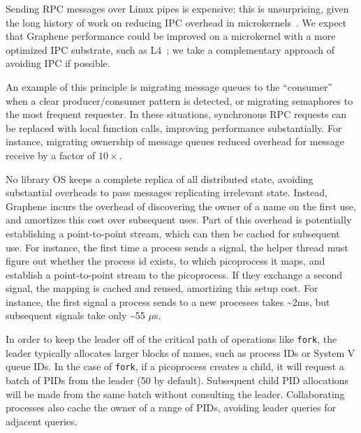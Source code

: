 \vspace{5pt}
Sending RPC messages over Linux pipes is expensive;
this is unsurprising, given the long history of 
work on reducing IPC overhead in microkernels~\citep{liedtke93sosp,chen93memory}.  
We expect that Graphene performance could be improved on a 
microkernel with
a more optimized IPC substrate, such as L4~\citep{liedtke95sosp,klein09sel4,elphinstone13microkernels};
we take a complementary approach of avoiding IPC if possible.

An example of this principle is migrating message queues to the ``consumer'' when a 
clear producer/consumer pattern is detected, or migrating semaphores to the most frequent requester.
In these situations, synchronous RPC requests can be replaced with local function calls, improving
performance substantially.  For instance, migrating ownership of message queues 
reduced overhead for message receive by a factor of $10\times$.

\vspace{5pt}
No library OS keeps a complete replica of all distributed state,
avoiding substantial overheads to pass messages replicating irrelevant state.
Instead, Graphene incurs the overhead of discovering the owner of a name
on the first use, and amortizes this cost over subsequent uses.
Part of this overhead is potentially establishing a point-to-point stream,
which can then be cached for subsequent use.
For instance, the first time a process sends a signal, the helper thread 
must figure out whether the process id exists, to which picoprocess it maps,
and establish a point-to-point stream to the picoprocess.
If they exchange a second signal, the mapping is cached and reused, amortizing this 
setup cost.  For instance, the first signal a process sends to a new processes
takes \~{}2ms, but subsequent signals take only \~{}55 $\mu$s.

\vspace{5pt}
In order to keep the leader off of the critical path of operations like {\tt fork}, 
the leader typically allocates larger blocks of names, such as process IDs or System V queue IDs.
In the case of {\tt fork}, if a picoprocess creates a child, it will request a batch of 
PIDs from the leader (50 by default).  Subsequent child PID allocations will be made from the same 
batch without consulting the leader.
Collaborating processes also cache the owner of a range of PIDs, avoiding 
leader queries for adjacent queries.

